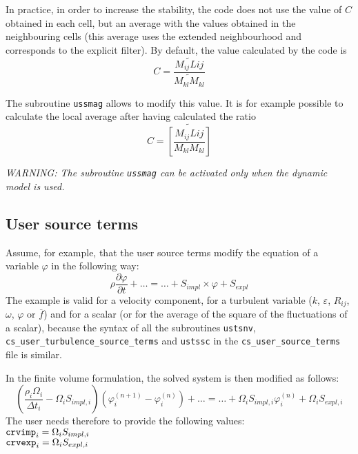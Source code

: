 {{{In practice, in order to increase the stability, the code does not use the
value of $C$ obtained in each cell, but an average with the values
obtained in the neighbouring cells (this average uses the extended
neighbourhood and corresponds to the explicit filter). By default, the
value calculated by the code is
\begin{displaymath}
C=\frac{\widetilde{M_{ij}L{ij}}}{\widetilde{M_{kl}M_{kl}}}
\end{displaymath}

The subroutine \texttt{ussmag} allows to modify this value. It is for
example possible to calculate the local average after having calculated the
ratio
\begin{displaymath}
C=\widetilde{\left[\frac{M_{ij}L{ij}}{M_{kl}M_{kl}}\right]}
\end{displaymath}

{\em WARNING: The subroutine {\em\texttt{ussmag}} can be activated only when
the dynamic model is used.}

\subsection{User source terms}
\label{sec:prg_usersourceterms}

Assume, for example, that the user source terms modify the equation of a
variable $\varphi$ in the following way:
\begin{displaymath}
\rho\frac{\partial \varphi}{\partial t}+\ldots = \ldots + S_{impl}\times\varphi+S_{expl}
\end{displaymath}
The example is valid for a velocity component, for a turbulent variable ($k$, $\varepsilon$, $R_{ij}$, $\omega$,
$\varphi$ or $\overline{f}$) and for a scalar (or for the average of the
square of the fluctuations of a scalar), because the syntax of all the
subroutines \texttt{ustsnv}, \texttt{cs\_user\_turbulence\_source\_terms}
 and \texttt{ustssc} in the \texttt{cs\_user\_source\_terms} file is similar.

In the finite volume formulation, the solved system is then modified as
follows:
\begin{displaymath}
\left(\frac{\rho_i\Omega_i}{\Delta t_i}-\Omega_iS_{impl,i}\right)
\left(\varphi_i^{(n+1)}-\varphi_i^{(n)}\right)
+\ldots = \ldots + \Omega_iS_{impl,i}\varphi_i^{(n)} + \Omega_iS_{expl,i}
\end{displaymath}
The user needs therefore to provide the following values:\\
$\text{\texttt{crvimp}}_i=\Omega_iS_{impl,i}$\\
$\text{\texttt{crvexp}}_i=\Omega_iS_{expl,i}$

}}}
